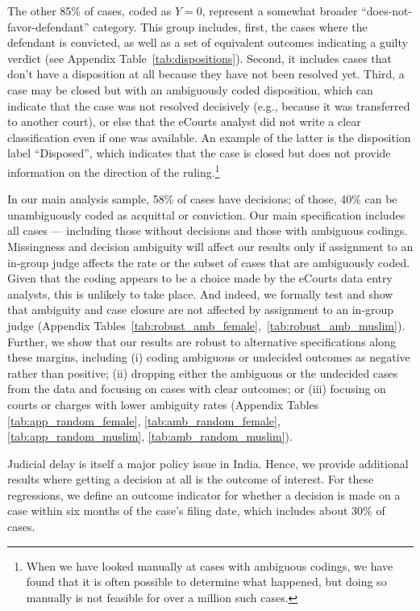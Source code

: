 \documentclass[12pt,english]{article}
\begin{document}
The other 85\% of cases, coded as $Y=0$, represent a somewhat broader ``does-not-favor-defendant'' category. This group includes, first, the cases where the defendant is convicted, as well as a set of equivalent outcomes indicating a guilty verdict (see Appendix Table~\ref{tab:dispositions}). Second, it includes cases that don't have a disposition at all because they have not been resolved yet. Third, a case may be closed but with an ambiguously coded disposition, which can indicate that the case was not resolved decisively (e.g., because it was transferred to another court), or else that the eCourts analyst did not write a clear classification even if one was available. An example of the latter is the disposition label ``Disposed'', which indicates that the case is closed but does not provide information on the direction of the ruling.\footnote{When we have looked manually at cases with ambiguous codings, we have found that it is often possible to determine what happened, but doing so manually is not feasible for over a million such cases.}

In our main analysis sample, 58\% of cases have decisions; of those, 40\% can be unambiguously coded as acquittal or conviction. Our main specification includes all cases --- including those without decisions and those with ambiguous codings. Missingness and decision ambiguity will affect our results only if assignment to an in-group judge affects the rate or the subset of cases that are ambiguously coded. Given that the coding appears to be a choice made by the eCourts data entry analysts, this is unlikely to take place. And indeed, we formally test and show that ambiguity and case closure are not affected by assignment to an in-group judge (Appendix Tables~\ref{tab:robust_amb_female},~\ref{tab:robust_amb_muslim}). Further, we show that our results are robust to alternative specifications along these margins, including (i) coding ambiguous or undecided outcomes as negative rather than positive; (ii) dropping either the ambiguous or the undecided cases from the data and focusing on cases with clear outcomes; or (iii) focusing on courts or charges with lower ambiguity rates (Appendix Tables \ref{tab:app_random_female}, \ref{tab:amb_random_female}, \ref{tab:app_random_muslim}, \ref{tab:amb_random_muslim}). 

Judicial delay is itself a major policy issue in India. Hence, we provide additional results where getting a decision at all is the outcome of interest. For these regressions, we define an outcome indicator for whether a decision is made on a case within six months of the case's filing date, which includes about 30\% of cases.
\end{document}
